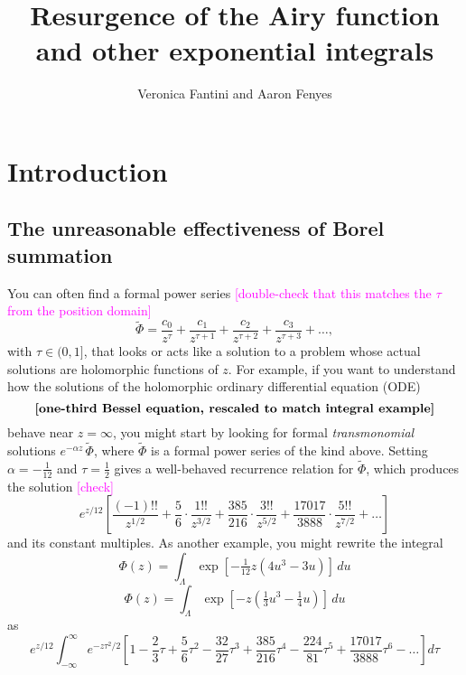 \documentclass{article}
\title{Resurgence of the Airy function \\ and other exponential integrals}
\author{Veronica Fantini and Aaron Fenyes}
\newcommand{\series}{\tilde}
\begin{document}
\maketitle
\section{Introduction}
\subsection{The unreasonable effectiveness of Borel summation}\label{intro:summation}
You can often find a formal power series \textcolor{magenta}{[double-check that this matches the $\tau$ from the position domain]}
\[ \series{\Phi} = \frac{c_0}{z^\tau} + \frac{c_1}{z^{\tau+1}} + \frac{c_2}{z^{\tau+2}} + \frac{c_3}{z^{\tau+3}} + \ldots, \]
with $\tau \in (0, 1]$, that looks or acts like a solution to a problem whose actual solutions are holomorphic functions of $z$. For example, if you want to understand how the solutions of the holomorphic ordinary differential equation (ODE)
\begin{equation}
\text{\bf [one-third Bessel equation, rescaled to match integral example]} \label{eqn:bessel-rescaled}
\end{equation}
behave near $z = \infty$, you might start by looking for formal {\em transmonomial} solutions $e^{-\alpha z}\,\series{\Phi}$, where $\series{\Phi}$ is a formal power series of the kind above. Setting $\alpha = -\tfrac{1}{12}$ and $\tau = \tfrac{1}{2}$ gives a well-behaved recurrence relation for $\series{\Phi}$, which produces the solution \textcolor{magenta}{[check]}
\begin{equation}
e^{z/12} \left[ \frac{(-1)!!}{z^{1/2}} + \frac{5}{6} \cdot \frac{1!!}{z^{3/2}} + \frac{385}{216} \cdot \frac{3!!}{z^{5/2}} + \frac{17017}{3888} \cdot \frac{5!!}{z^{7/2}} + \ldots \right] \label{series:bessel-ex}
\end{equation}
and its constant multiples. As another example, you might rewrite the integral
\color{DodgerBlue}
\[ \Phi(z) = \int_{\Lambda} \exp\left[-\tfrac{1}{12} z \left(4u^3 - 3u\right)\right]\,du \]
\color{black}
\[ \Phi(z) = \int_{\Lambda} \exp\left[-z \left(\tfrac{1}{3} u^3 - \tfrac{1}{4} u\right)\right]\,du \]
as
\[ e^{z/12} \int_{-\infty}^\infty e^{-z\tau^2/2} \left[ 1 - \frac{2}{3} \tau + \frac{5}{6} \tau^2 - \frac{32}{27} \tau^3 + \frac{385}{216} \tau^4 - \frac{224}{81} \tau^5 + \frac{17017}{3888} \tau^6 - \ldots \right] d\tau \]
\end{document}
